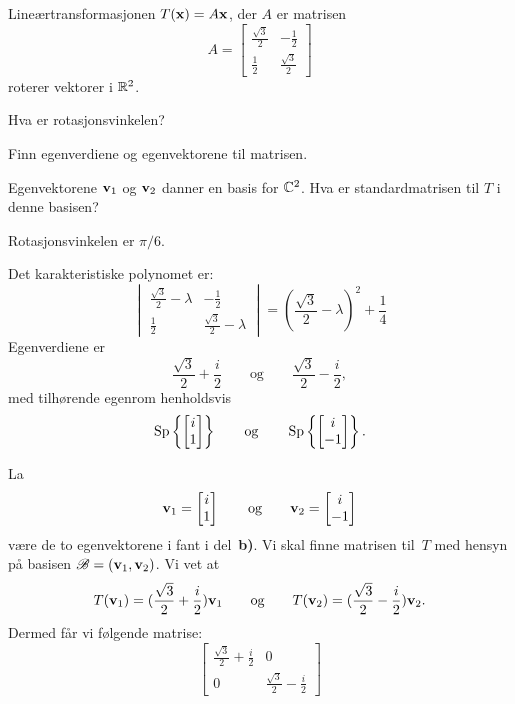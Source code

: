 \begin{oppgave}
Lineærtransformasjonen $T(\mathbf{x})=A\mathbf{x}$, der $A$ er matrisen
\[
A=
\begin{bmatrix}
\frac{\sqrt{3}}{2} & -\frac{1}{2} \\ \frac{1}{2} & \frac{\sqrt{3}}{2}
\end{bmatrix}
\]
roterer vektorer i $\mathbb{R}^2$. 
\begin{punkt}
Hva er rotasjonsvinkelen?
\end{punkt}
\begin{punkt}
Finn egenverdiene og egenvektorene til matrisen. 
\end{punkt}
\begin{punkt}
Egenvektorene $\mathbf{v}_1$ og $\mathbf{v}_2$ danner en basis for $\mathbb{C}^2$. Hva er standardmatrisen til $T$ i denne basisen?
\end{punkt}

\end{oppgave}


\begin{losning}
\begin{punkt}
Rotasjonsvinkelen er $\pi/6$.
\end{punkt}
\begin{punkt}
Det karakteristiske polynomet er:
\[
\begin{vmatrix}
\frac{\sqrt{3}}{2} - \lambda & -\frac{1}{2}                 \\
\frac{1}{2}                  & \frac{\sqrt{3}}{2} - \lambda
\end{vmatrix}
=
(\frac{\sqrt{3}}{2} - \lambda)^2 + \frac{1}{4}
\]
Egenverdiene er
\[
\frac{\sqrt{3}}{2} + \frac{i}{2}
\qquad\text{og}\qquad
\frac{\sqrt{3}}{2} - \frac{i}{2},
\]
med tilhørende egenrom henholdsvis
\[
\operatorname{Sp} \left\{ \begin{bmatrix} i \\ 1 \end{bmatrix} \right\}
\qquad\text{og}\qquad
\operatorname{Sp} \left\{ \begin{bmatrix} i \\ -1 \end{bmatrix} \right\}.
\]
\end{punkt}
\begin{punkt}
La
\[
\mathbf{v}_1 = \begin{bmatrix} i \\ 1 \end{bmatrix}
\qquad\text{og}\qquad
\mathbf{v}_2 = \begin{bmatrix} i \\ -1 \end{bmatrix}
\]
være de to egenvektorene i fant i del~\textbf{b)}.  Vi skal finne
matrisen til~$T$ med hensyn på basisen $\mathscr{B} = (\mathbf{v}_1, \mathbf{v}_2)$.  Vi vet at
\[
T(\mathbf{v}_1) = (\frac{\sqrt{3}}{2} + \frac{i}{2}) \mathbf{v}_1
\qquad\text{og}\qquad
T(\mathbf{v}_2) = (\frac{\sqrt{3}}{2} - \frac{i}{2}) \mathbf{v}_2.
\]
Dermed får vi følgende matrise:
\[
\begin{bmatrix}
\frac{\sqrt{3}}{2} + \frac{i}{2} & 0 \\
0 & \frac{\sqrt{3}}{2} - \frac{i}{2}
\end{bmatrix}
\]
\end{punkt}
\end{losning}




